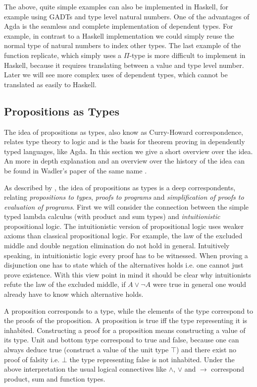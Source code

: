 The above, quite simple examples can also be implemented in Haskell, for
example using GADTs and type level natural numbers.
One of the advantages of Agda is the seamless and complete implementation of
dependent types.
For example, in contrast to a Haskell implementation we could simply reuse the
normal type of natural numbers to index other types.
The last example of the function replicate, which simply uses a $\Pi$-type is
more difficult to implement in Haskell, because it requires translating between
a value and type level number.
Later we will see more complex uses of dependent types, which cannot be
translated as easily to Haskell.


\subsection{Propositions as Types}

The idea of propositions as types, also know as Curry-Howard correspondence,
relates type theory to logic and is the basis for theorem proving in
dependently typed languages, like Agda.
In this section we give a short overview over the idea.
An more in depth explanation and an overview over the history of the idea can be
found in Wadler's paper of the same name \cite{DBLP:journals/cacm/Wadler15}.

As described by \textcite{DBLP:journals/cacm/Wadler15}, the idea of propositions
as types is a deep correspondents, relating \textit{propositions to types},
\textit{proofs to programs} and \textit{simplification of proofs to evaluation
of programs}.
First we will consider the connection between the simple typed lambda calculus
(with product and sum types) and \textit{intuitionistic} propositional logic.
The intuitionistic version of propositional logic uses weaker axioms than
classical propositional logic.
For example, the law of the excluded middle and double negation elimination do
not hold in general.
Intuitively speaking, in intuitionistic logic every proof has to be witnessed.
When proving a disjunction one has to state which of the alternatives holds i.e.
one cannot just prove existence.
With this view point in mind it should be clear why intuitionists refute the law
of the excluded middle, if $A \vee \neg A$ were true in general one would
already have to know which alternative holds.

A proposition corresponds to a type, while the elements of the type correspond
to the proofs of the proposition.
A proposition is true iff the type representing it is inhabited.
Constructing a proof for a proposition means constructing a value of its type.
Unit and bottom type correspond to true and false, because one can always deduce
true (construct a value of the unit type $\top$) and there exist no proof of
falsity i.e. $\bot$ the type representing false is not inhabited.
Under the above interpretation the usual logical connectives like $\wedge$,
$\vee$ and $\rightarrow$ correspond product, sum and function types.

